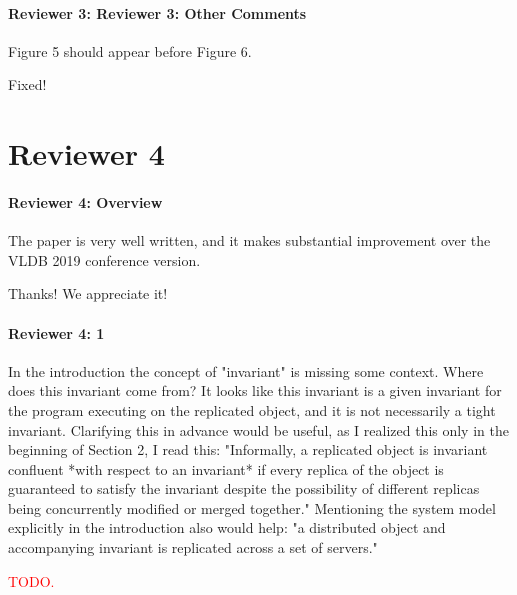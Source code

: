 \documentclass[9pt]{article}
\begin{document}
\begin{multicols*}{2}
\paragraph{Reviewer 3: Reviewer 3: Other Comments}
\begin{feedback}
  Figure 5 should appear before Figure 6.
\end{feedback}
Fixed!

\section*{Reviewer 4}
\paragraph{Reviewer 4: Overview}
\begin{feedback}
  The paper is very well written, and it makes substantial improvement over the
  VLDB 2019 conference version.
\end{feedback}
Thanks! We appreciate it!

\paragraph{Reviewer 4: 1}
\begin{feedback}
  In the introduction the concept of "invariant" is missing some context. Where
  does this invariant come from? It looks like this invariant is a given
  invariant for the program executing on the replicated object, and it is not
  necessarily a tight invariant.  Clarifying this in advance would be useful,
  as I realized this only in the beginning of Section 2, I read this:
  "Informally, a replicated object is invariant confluent *with respect to an
  invariant* if every replica of the object is guaranteed to satisfy the
  invariant despite the possibility of different replicas being concurrently
  modified or merged together." Mentioning the system model explicitly in the
  introduction also would help: "a distributed object and accompanying
  invariant is replicated across a set of servers."
\end{feedback}
\textcolor{red}{TODO.}


\end{multicols*}
\end{document}
